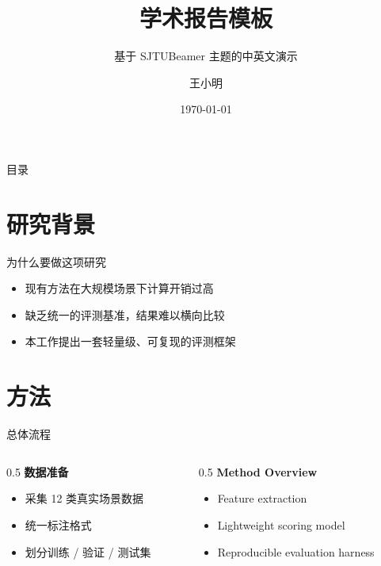 \documentclass[xcolor=table,aspectratio=169]{ctexbeamer}
\title{学术报告模板}
\subtitle{基于 SJTUBeamer 主题的中英文演示}
\author{王小明}
\institute{上海交通大学 计算机科学与工程系}
\date{\today}
\begin{document}
\begin{frame}
  \titlepage
\end{frame}

\begin{frame}{目录}
  \tableofcontents
\end{frame}

\section{研究背景}

\begin{frame}{为什么要做这项研究}
  \begin{itemize}
    \item 现有方法在大规模场景下计算开销过高
    \item 缺乏统一的评测基准，结果难以横向比较
    \item 本工作提出一套轻量级、可复现的评测框架
  \end{itemize}
\end{frame}

\section{方法}

\begin{frame}{总体流程}
  \begin{columns}[T]
    \begin{column}{0.5\textwidth}
      \textbf{数据准备}
      \begin{itemize}
        \item 采集 12 类真实场景数据
        \item 统一标注格式
        \item 划分训练 / 验证 / 测试集
      \end{itemize}
    \end{column}
    \begin{column}{0.5\textwidth}
      \textbf{Method Overview}
      \begin{itemize}
        \item Feature extraction
        \item Lightweight scoring model
        \item Reproducible evaluation harness
      \end{itemize}
    \end{column}
  \end{columns}
\end{frame}
\end{document}
